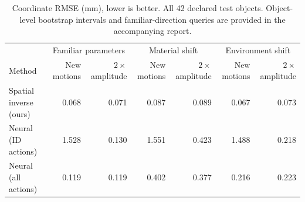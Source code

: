 \begin{table}[t]
\centering\small\setlength{\tabcolsep}{3pt}
\begin{tabular}{lrrrrrr}
\toprule
& \multicolumn{2}{c}{Familiar parameters} & \multicolumn{2}{c}{Material shift} & \multicolumn{2}{c}{Environment shift} \\
Method & New motions & $2\times$ amplitude & New motions & $2\times$ amplitude & New motions & $2\times$ amplitude \\
\midrule
Spatial inverse (ours) & 0.068 & 0.071 & 0.087 & 0.089 & 0.067 & 0.073 \\
Neural (ID actions) & 1.528 & 0.130 & 1.551 & 0.423 & 1.488 & 0.218 \\
Neural (all actions) & 0.119 & 0.119 & 0.402 & 0.377 & 0.216 & 0.223 \\
\bottomrule
\end{tabular}
\caption{Coordinate RMSE (mm), lower is better. All 42 declared test objects. Object-level bootstrap intervals and familiar-direction queries are provided in the accompanying report.}
\label{tab:main}
\end{table}
